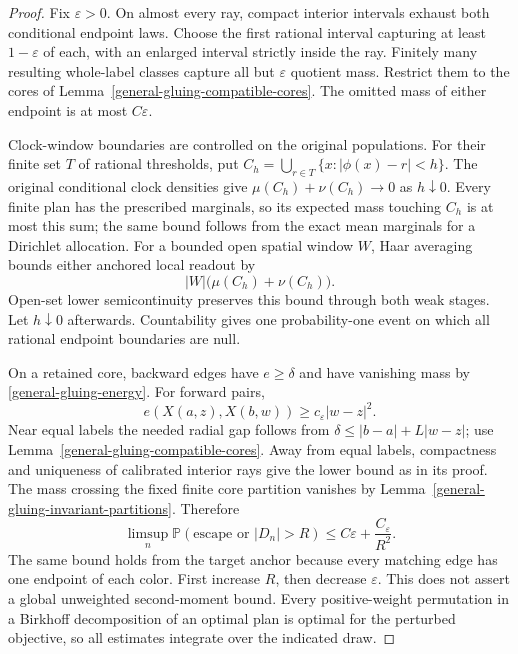 \documentclass[11pt,reqno]{amsart}
\theoremstyle{definition}
\theoremstyle{remark}
\numberwithin{equation}{section}
\newcommand{\Pp}{\mathbb P}
\begin{document}
\begin{proof}
Fix \(\varepsilon>0\). On almost every ray, compact interior intervals
exhaust both conditional endpoint laws. Choose the first rational interval
capturing at least \(1-\varepsilon\) of each, with an enlarged interval
strictly inside the ray. Finitely many resulting whole-label classes
capture all but \(\varepsilon\) quotient mass. Restrict them to the
cores of Lemma~\ref{general-gluing-compatible-cores}. The omitted mass
of either endpoint is at most \(C\varepsilon\).

Clock-window boundaries are controlled on the original populations.
For their finite set \(T\) of rational thresholds, put
\(C_h=\bigcup_{r\in T}\{x:|\phi(x)-r|<h\}\). The original
conditional clock densities give
\(\mu(C_h)+\nu(C_h)\to0\) as \(h\downarrow0\). Every finite
plan has the prescribed marginals, so its expected mass touching
\(C_h\) is at most this sum; the same bound follows from the exact
mean marginals for a Dirichlet allocation. For a bounded open spatial
window \(W\), Haar averaging bounds either anchored local readout by
\[
 |W|\bigl(\mu(C_h)+\nu(C_h)\bigr).
\]
Open-set lower semicontinuity preserves this bound through both weak
stages. Let \(h\downarrow0\) afterwards. Countability gives one
probability-one event on which all rational endpoint boundaries are null.

On a retained core, backward edges have \(e\ge\delta\) and have vanishing
mass by \eqref{general-gluing-energy}. For forward pairs,
\[
 e(X(a,z),X(b,w))\ge c_\varepsilon|w-z|^2.
\]
Near equal labels the needed radial gap follows from
\(\delta\le |b-a|+L|w-z|\); use
Lemma~\ref{general-gluing-compatible-cores}. Away from equal labels,
compactness and uniqueness of calibrated interior rays give the lower
bound as in its proof. The mass crossing the fixed finite core partition
vanishes by Lemma~\ref{general-gluing-invariant-partitions}. Therefore
\begin{equation}
\label{general-gluing-two-scale-tail}
 \limsup_n\Pp(\text{escape or }|D_n|>R)
       \le C\varepsilon+\frac{C_\varepsilon}{R^2}.
\end{equation}
The same bound holds from the target anchor because every matching edge
has one endpoint of each color. First increase \(R\), then decrease
\(\varepsilon\). This does not assert a global unweighted second-moment
bound. Every positive-weight permutation in a Birkhoff decomposition of
an optimal plan is optimal for the perturbed objective, so all estimates
integrate over the indicated draw.
\end{proof}
\end{document}
